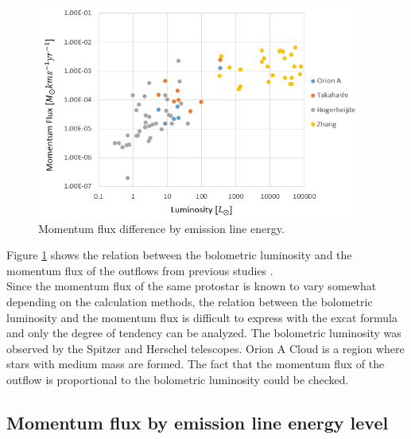 \begin{figure}[h!]
	\centering
	\includegraphics[width=0.95\textwidth]{Luminosity}
	\caption{Momentum flux difference by emission line energy.}
	\label{fig:lum}
\end{figure}


Figure \ref{fig:lum} shows the relation between the bolometric luminosity and the momentum flux of the outflows from previous studies \cite{takahashi2008millimeter, van2013outflow, hogerheijde1998envelope, nakamura2012evidence, aso2000dense, zhang2005search}. \\ Since the momentum flux of the same protostar is known to vary somewhat depending on the calculation methods\cite{van2013outflow}, the relation between the bolometric luminosity and the momentum flux is difficult to express with the excat formula and only the degree of tendency can be analyzed.
The bolometric luminosity was observed by the Spitzer and Herschel telescopes. Orion A Cloud is a region where stars with medium mass are formed. The fact that the momentum flux of the outflow is proportional to the bolometric luminosity could be checked.

\newpage

\subsection{Momentum flux by emission line energy level}

